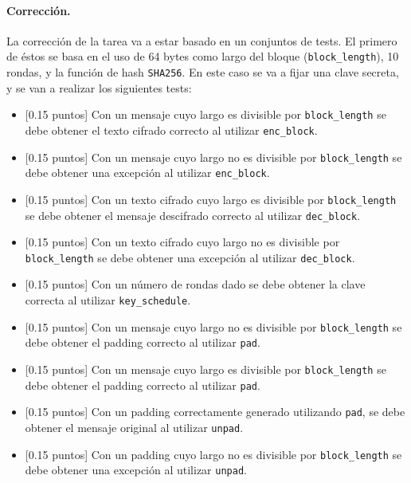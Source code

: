 \paragraph{Corrección.}
La corrección de la tarea va a estar basado en un conjuntos de tests. El primero de éstos se basa en el uso de 64 bytes como largo del bloque (\texttt{block\_length}), 10 rondas, y la función de hash \texttt{SHA256}. En este caso se va a fijar una clave secreta, y se van a realizar los siguientes tests:
\begin{itemize}
\item{[0.15 puntos]} Con un mensaje cuyo largo es divisible por \texttt{block\_length} se debe obtener el texto cifrado correcto al utilizar \texttt{enc\_block}.

\item{[0.15 puntos]}  Con un mensaje cuyo largo no es divisible por \texttt{block\_length} se debe obtener una excepción al utilizar \texttt{enc\_block}.

\item{[0.15 puntos]}  Con un texto cifrado cuyo largo es divisible por \texttt{block\_length} se debe obtener el mensaje descifrado correcto al utilizar \texttt{dec\_block}.

\item{[0.15 puntos]}  Con un texto cifrado cuyo largo no es divisible por \texttt{block\_length} se debe obtener una excepción al utilizar \texttt{dec\_block}.

\item{[0.15 puntos]} Con un número de rondas dado se debe obtener la clave correcta al utilizar \texttt{key\_schedule}.

\item{[0.15 puntos]} Con un mensaje cuyo largo no es divisible por \texttt{block\_length} se debe obtener el padding correcto al utilizar \texttt{pad}.

\item{[0.15 puntos]} Con un mensaje cuyo largo es divisible por \texttt{block\_length} se debe obtener el padding correcto al utilizar \texttt{pad}.

\item{[0.15 puntos]} Con un padding correctamente generado utilizando \texttt{pad}, se debe obtener el mensaje original al utilizar \texttt{unpad}.

\item{[0.15 puntos]} Con un padding cuyo largo no es divisible por \texttt{block\_length} se debe obtener una excepción al utilizar \texttt{unpad}.


\end{itemize}
